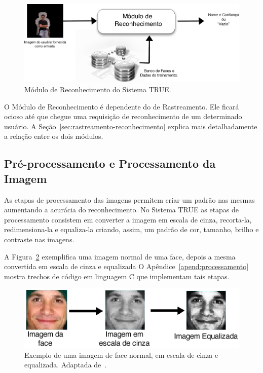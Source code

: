 		\begin{figure}[hbt]
			\begin{center}
				\includegraphics[scale=2.0]{figuras/4.ProblemaEProposta/reconhecimento-simples.png}
			\end{center}
			\caption{Módulo de Reconhecimento do Sistema TRUE.}
			\label{fig:processo-reconhecimento}
		\end{figure}

	O Módulo de Reconhecimento é dependente do de Rastreamento. Ele ficará ocioso
	até que chegue uma requisição de reconhecimento de um determinado usuário. A
	Seção~\ref{sec:rastreamento-reconhecimento} explica mais detalhadamente a
	relação entre os dois módulos.

	\subsection{Pré-processamento e Processamento da Imagem}
		
		As etapas de processamento das imagens permitem criar um padrão nas mesmas aumentando a acurácia do reconhecimento. No Sistema TRUE as etapas de processamento consistem em converter a imagem em escala de cinza, recorta-la, redimensiona-la e equaliza-la criando, assim, um padrão de cor, tamanho, brilho e contraste nas imagens.

		A Figura~\ref{fig:greyscale} exemplifica uma imagem normal de uma face,
		depois a mesma convertida em escala de cinza e equalizada O
		Apêndice~\ref{apend:processamento} mostra trechos de código em linguagem C
		que implementam tais etapas.

		\begin{figure}[hbt]
			\begin{center}
				\includegraphics[scale=0.7]{figuras/4.ProblemaEProposta/greyscale.png}
			\end{center}
			\caption{Exemplo de uma imagem de face normal, em escala de cinza e equalizada. Adaptada de~\cite{shervin}.}
			\label{fig:greyscale}
		\end{figure}


